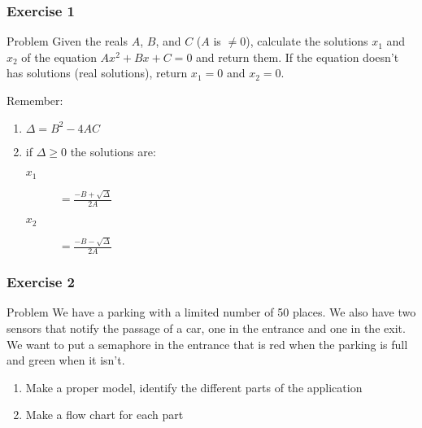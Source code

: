 \begin{frame}
  \frametitle{Exercise 1}
  \begin{block}{Problem}
    Given the reals \alert{$A$}, \alert{$B$}, and \alert{$C$} ($A$ is
    $\neq 0$), calculate the
    solutions \alert{$x_1$} and \alert{$x_2$} of the equation
    \alert{$Ax^2+Bx+C=0$} and return them. If the equation doesn't has
    solutions (real solutions), return \alert{$x_1=0$} and \alert{$x_2=0$}.
  \end{block}
  \pause
  Remember:
  \begin{enumerate}
  \item \alert{$\Delta$}$= B^2-4AC$
  \item if $\Delta \geq 0$ the solutions are:
    \begin{description}
    \item[\alert{$x_1$}]$=\frac{-B+\sqrt{\Delta}}{2A}$
    \item[\alert{$x_2$}]$=\frac{-B-\sqrt{\Delta}}{2A}$
    \end{description}
  \end{enumerate}
\end{frame}

\begin{frame}
  \frametitle{Exercise 2}
  \begin{block}{Problem}
    We have a parking with a limited number of 50 places. We also have
    two sensors that notify the passage of a car, one in the entrance
    and one in the exit. We want to put a semaphore in the entrance
    that is red when the parking is full and green when it isn't. 
  \end{block}
  \pause
  \begin{enumerate}
  \item Make a proper model, identify the different parts of the application
  \item Make a flow chart for each part
  \end{enumerate}
\end{frame}
